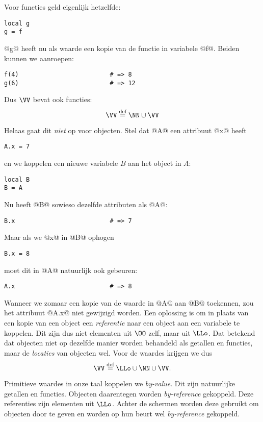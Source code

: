 Voor functies geld eigenlijk hetzelfde:
\begin{lstlisting}
local g
g = f
\end{lstlisting}
@g@ heeft nu als waarde een kopie van de functie in variabele @f@. Beiden kunnen we aanroepen:
\begin{lstlisting}
f(4)                         # => 8
g(6)                         # => 12
\end{lstlisting}
Dus $\VV$ bevat ook functies:
\begin{equation*}
  \VV \DEF \NN \cup \VV
\end{equation*}

Helaas gaat dit \emph{niet} op voor objecten. Stel dat @A@ een attribuut @x@ heeft
\begin{lstlisting}
A.x = 7
\end{lstlisting}
en we koppelen een nieuwe variabele $B$ aan het object in $A$:
\begin{lstlisting}
local B
B = A
\end{lstlisting}
Nu heeft @B@ sowieso dezelfde attributen als @A@:
\begin{lstlisting}
B.x                          # => 7
\end{lstlisting}
Maar als we @x@ in @B@ ophogen
\begin{lstlisting}
B.x = 8
\end{lstlisting}
moet dit in @A@ natuurlijk ook gebeuren:
\begin{lstlisting}
A.x                          # => 8
\end{lstlisting}
Wanneer we zomaar een kopie van de waarde in @A@ aan @B@ toekennen, zou het attribuut @A.x@ niet gewijzigd worden. Een oplossing is om in plaats van een kopie van een object een \emph{referentie} naar een object aan een variabele te koppelen. Dit zijn dus niet elementen uit $\OO$ zelf, maar uit $\LLo$. Dat betekend dat objecten niet op dezelfde manier worden behandeld als getallen en functies, maar de \emph{locaties} van objecten wel. Voor de waardes krijgen we dus
\begin{equation*}
  \VV \DEF \LLo \cup \NN \cup \VV.
\end{equation*}

Primitieve waardes in onze taal koppelen we \emph{by-value}. Dit zijn natuurlijke getallen en functies. Objecten daarentegen worden \emph{by-reference} gekoppeld. Deze referenties zijn elementen uit $\LLo$. Achter de schermen worden deze gebruikt om objecten door te geven en worden op hun beurt wel \emph{by-reference} gekoppeld.

